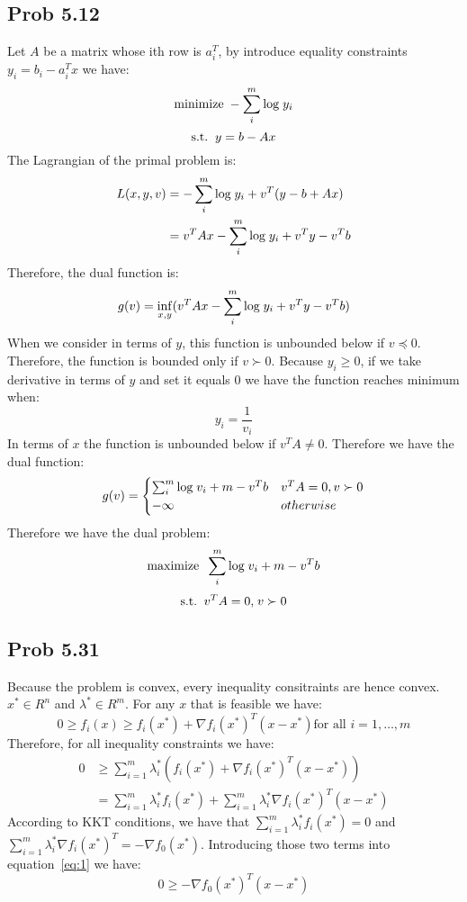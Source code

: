 \message{ !name(ass3_ChangLi.tex)}\documentclass[10pt,a4paper]{article}
\begin{document}
\subsection{Prob 5.12}
Let $A$ be a matrix whose ith row is $a_i^T$, by introduce
equality constraints $y_i=b_i-a_i^Tx$ we have:
$$
\text{minimize\;} -\sum_i^m\text{log\;}y_i
$$
$$
\text{s.t.\;\;} y=b-Ax
$$
The Lagrangian of the primal problem is:
\begin{align*}
  L(x,y,v) &= -\sum_i^m\text{log\;}y_i + v^T(y-b+Ax)\\
         &= v^TAx -\sum_i^m\text{log\;}y_i + v^Ty-v^Tb
\end{align*}
Therefore, the dual function is:
$$
g(v)=\inf_{x,y} (v^TAx -\sum_i^m\text{log\;}y_i + v^Ty-v^Tb)
$$
When we consider in terms of $y$, this function is unbounded
below if $v\preceq0$. Therefore, the function is bounded
only if $v\succ0$. Because $y_i\geq0$, if we take derivative
in terms of $y$ and set it equals $0$ we have the function
reaches minimum when:
$$
y_i=\frac{1}{v_i}
$$
In terms of $x$ the function is unbounded below if
$v^TA\neq0$. Therefore we have the dual function:
\begin{align*}
g(v)=
\begin{cases}
  \sum_i^m\text{log\;}v_i + m-v^Tb & v^TA=0, v\succ0\\
  -\infty &otherwise
\end{cases}
\end{align*}
Therefore we have the dual problem:
$$
\text{maximize\;\;}\sum_i^m\text{log\;}v_i + m-v^Tb 
$$
$$
\text{s.t.\;\;} v^TA=0\text{,\;} v\succ0
$$


\subsection{Prob 5.31}
Because the problem is convex, every inequality consitraints
are hence convex. $x^*\in R^n$ and $\lambda^*\in R^m$. For any $x$ that is feasible we have:
$$
0\geq f_i(x) \geq f_i(x^*) +\nabla f_i(x^*)^T(x-x^*)\text{
  for all } i=1,\dots,m
$$
Therefore, for all inequality constraints we have:
\begin{align}
  0 &\geq \sum_{i=1}^m\lambda_i^*(f_i(x^*)+\nabla f_i(x^*)^T(x-x^*))\\
\label{eq:1}
&= \sum_{i=1}^m\lambda_i^*f_i(x^*)+\sum_{i=1}^m\lambda_i^*\nabla f_i(x^*)^T(x-x^*)
\end{align}
According to KKT conditions, we have that
$\sum_{i=1}^m\lambda_i^*f_i(x^*)=0$ and
$\sum_{i=1}^m\lambda_i^*\nabla f_i(x^*)^T=-\nabla f_0(x^*)$.
Introducing those two terms into equation~\ref{eq:1} we have:
$$
0\geq-\nabla f_0(x^*)^T(x-x^*)
$$


	\renewcommand\refname{Bibliography}
	
	
\end{document}
